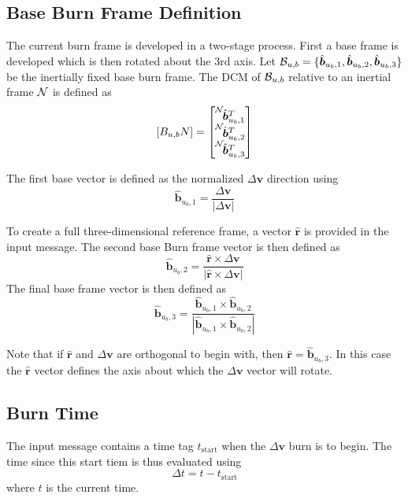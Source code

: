 \subsection{Base Burn Frame Definition}
The current burn frame is developed in a two-stage process.  First a base frame is developed which is then rotated about the 3rd axis.  Let ${\cal B}_{u,b} = \{\hat{\bm b}_{u_{b},1}, \hat{\bm b}_{u_{b},2}, \hat{\bm b}_{u_{b},3} \}$ be the inertially fixed base burn frame.  The DCM of ${\cal B}_{u,b}$ relative to an inertial frame $\cal N$ is defined as
\begin{equation}
	\label{eq:dvAttGuid0}
	[B_{u,b}N] = \begin{bmatrix}
		\leftexp{N}{\hat{\bm b}_{u_{b},1}}^{T} \\
		\leftexp{N}{\hat{\bm b}_{u_{b},2}}^{T} \\
		\leftexp{N}{\hat{\bm b}_{u_{b},3}}^{T} 		
	\end{bmatrix}
\end{equation}

The first base vector is defined as the normalized $\Delta\bm v$ direction using
\begin{equation}
	\label{eq:dvAttGuid1}
		\hat{\bm b}_{u_{b},1} = \frac{\Delta\bm v}{|\Delta \bm v|}
\end{equation}

To create a full three-dimensional reference frame, a vector $\hat{\bm r}$ is provided in the input message.  The second base Burn frame vector is then defined as
\begin{equation}
	\label{eq:dvAttGuid2}
		\hat{\bm b}_{u_{b},2} = \frac{\hat{\bm r} \times \Delta\bm v}{|\hat{\bm r} \times \Delta \bm v|}
\end{equation}
The final base frame vector is then defined as
\begin{equation}
	\label{eq:dvAttGuid3}
		\hat{\bm b}_{u_{b},3} = \frac{ \hat{\bm b}_{u_{b},1} \times \hat{\bm b}_{u_{b},2}}{|  \hat{\bm b}_{u_{b},1} \times \hat{\bm b}_{u_{b},2} |}
\end{equation}

Note that if $\hat{\bm r}$ and $\Delta\bm v$ are orthogonal to begin with, then $\hat{\bm r} = \hat{\bm b}_{u_{b},3}$.  In this case the $\hat{\bm r}$ vector defines the axis about which the $\Delta \bm v$ vector will rotate.  


\subsection{Burn Time}
The input message contains a time tag $t_{\text{start}}$ when the $\Delta\bm v$ burn is to begin.  The time since this start tiem is thus evaluated using
\begin{equation}
	\label{eq:dvAttGuid4}
		\Delta t = t - t_{\text{start}}
\end{equation}
where $t$ is the current time.

